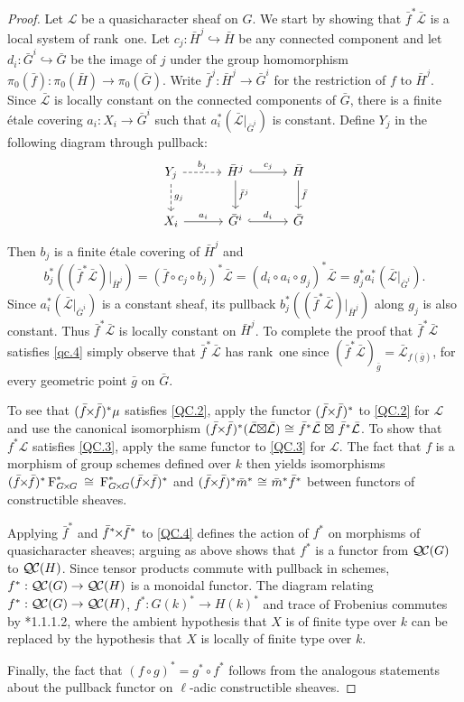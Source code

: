 \documentclass[11pt]{amsart}
\theoremstyle{plain}
\theoremstyle{definition}
\theoremstyle{remark}
\newcommand{\Fq}{k}
\newcommand{\Frob}[1]{\operatorname{F}_{#1}}
\newcommand{\iso}{{\ \cong\ }}
\newcommand{\qcs}[1]{{\mathcal{#1}}}
\newcommand{\gqcs}[1]{{\mathcal{\bar #1}}}
\newcommand{\QC}{{\mathcal{Q\hskip-0.8pt C}}}
\renewcommand{\bf}{\bar{f}}
\newcommand{\bg}{\bar{g}}
\newcommand{\bm}{\bar{m}}
\newcommand{\bG}{\bar{G}}
\newcommand{\bH}{\bar{H}}
\newcommand{\tight}[3]{\hspace{-#1pt}{#2}\hspace{-#3pt}}
\newcommand{\bfxf}{\text{$\bar{f} \tight{1}{\times}{1} \bar{f}$}}
\newcommand{\GxxG}{\text{$G \tight{1}{\times}{1} G$}}
\newcommand{\LxL}{\text{$\gqcs{L} \tight{0}{\boxtimes}{0} \gqcs{L}$}}
\begin{document}
\begin{proof}
  Let $\qcs{L}$ be a quasicharacter sheaf on $G$. We start by showing that
  $\bf^*\gqcs{L}$ is a local system of rank~one. Let $c_j :\bH^j \hookrightarrow \bH$ be any
  connected component and let $d_i : \bG^i \hookrightarrow \bG$ be the image of $j$ under the group
  homomorphism $\pi_0(\bf) : \pi_0(\bH) \to \pi_0(\bG)$.  Write $\bf^j : \bH^j \to \bG^i$
  for the restriction of $f$ to $\bH^j$.  Since $\gqcs{L}$ is locally constant on the connected
  components of $\bG$, there is a finite \'etale covering
  $a_i : X_i \to \bG^i$ such that $a_i^* (\gqcs{L}\vert_{\bG^i})$
  is constant.  Define $Y_j$ in the following diagram through pullback:
  \[
  \begin{tikzcd}[row sep=20, column sep=30]
   Y_j \dar[dashed]{g_j} \rar[dashed]{b_j} & \bH^j \dar{\bf^j} \rar[hook]{c_j} & \bH \dar{\bf} \\
   X_i \rar{a_i} & \bG^i \rar[hook]{d_i} & \bG
  \end{tikzcd}
  \]
  Then $b_j$ is a finite \'etale covering
  of $\bH^j$ and
  \[
  b_j^* \left( (\bf^* \gqcs{L})\vert_{\bH^j}\right)
  = (\bf\circ c_j \circ b_j)^*\gqcs{L}
  = (d_i\circ a_i\circ g_j)^*\gqcs{L} = g_j^* a_i^* (\gqcs{L}\vert_{\bG^i}).
  \]
%
  Since $a_i^* (\gqcs{L}\vert_{\bG^i})$ is a constant sheaf, its pullback
  $b_j^* \left( (\bf^*\gqcs{L})\vert_{\bH^j}\right)$ along $g_j$ is also constant.
  Thus $\bf^*\gqcs{L}$ is locally constant on
  $\bH^j$. To complete the proof that $\bf^*\gqcs{L}$ satisfies 
  \ref{qc.4}
  simply observe that $\bf^*\gqcs{L}$ has rank~one since 
  $(\bf^*\gqcs{L})_{\bg} = \gqcs{L}_{f(\bg)}$, for every geometric point ${\bg}$ on $\bG$.
  

  To see that $(\bfxf)^* \mu$ satisfies \ref{QC.2}, 
  apply the functor $(\bfxf)^*$
  to \ref{QC.2} for $\qcs{L}$ and use the canonical isomorphism
  $(\bfxf)^*(\LxL) \iso \bf^*\gqcs{L} \tight{-3}{\boxtimes}{-3} \bf^*\gqcs{L}$.
  To show that $f^*\qcs{L}$ satisfies 
  \ref{QC.3}, apply the same functor to \ref{QC.3} for $\qcs{L}$.
  The fact that $f$ is a morphism of group schemes defined over $\Fq$ then
  yields isomorphisms $(\bfxf)^*\Frob{\GxxG}^* \iso \Frob{\GxxG}^* (\bfxf)^*$
  and $(\bfxf)^* \bm^*\iso \bm^* \bf^*$ between functors of constructible sheaves.
  
  Applying $\bf^*$ and $\bf^* \tight{1}{\times}{1}\bf^*$ to \ref{QC.4} defines the action
  of $f^*$ on morphisms of quasicharacter sheaves; arguing as above shows that $f^*$ is
  a functor from $\QC(G)$ to $\QC(H)$.  Since tensor products commute with pullback in schemes,
  $f^* : \QC(G) \to \QC(H)$ is a monoidal functor.
%
  The diagram relating $f^* : \QC(G) \to \QC(H)$, $f^* : G(k)^* \to H(k)^*$ and trace of Frobenius
  commutes by \cite{laumon:87a}*{1.1.1.2}, where the ambient
  hypothesis that $X$ is of finite type over $\Fq$ can be replaced by
  the hypothesis that $X$ is locally of finite type over $\Fq$.
  
  Finally, the fact that $(f\circ g)^* = g^* \circ f^*$ follows from the analogous
  statements about the pullback functor on $\ell$-adic constructible sheaves.
\end{proof}
\end{document}
